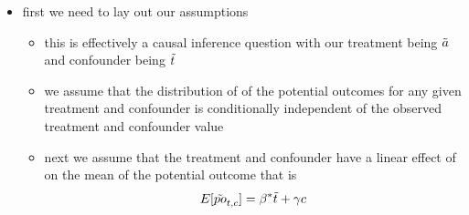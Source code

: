 \documentclass[12pt,twoside]{article}
\begin{document}
\begin{enumerate}
\begin{itemize}
\begin{enumerate}
        \begin{itemize}
            \item first we need to lay out our assumptions 
            \begin{itemize}
                \item this is effectively a causal inference question with our treatment being $\Tilde{a}$ and confounder being $\Tilde{t}$
                \item we assume that the distribution of of the potential outcomes for any given treatment and confounder is conditionally independent of the observed treatment and confounder value
                \item next we assume that the treatment and confounder have a linear effect of on the mean of the potential outcome that is $$E[\Tilde{po}_{t,c}]=\beta^{*}\Tilde{t}+\gamma c$$
            \end{itemize}
            

\end{itemize}
\end{enumerate}
\end{itemize}
\end{enumerate}
\end{document}
